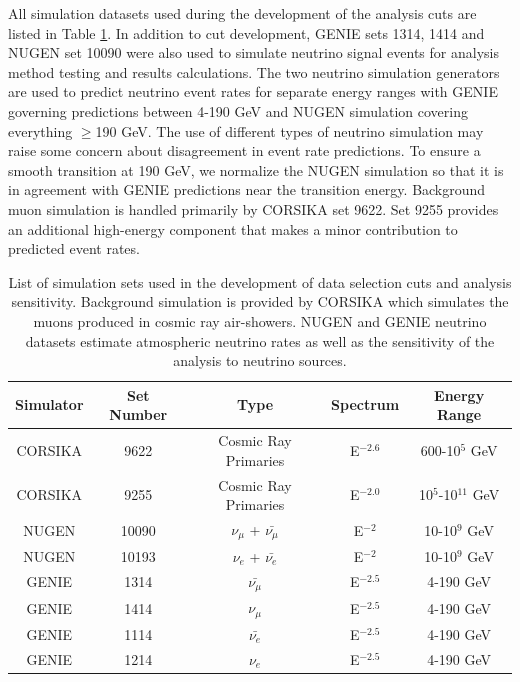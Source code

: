 \documentclass{gatech-thesis}
\begin{document}
All simulation datasets used during the development of the analysis cuts are listed in Table  \ref{tab:event_sel_sim}. In addition to cut development, GENIE sets 1314, 1414 and NUGEN set 10090 were also used to simulate neutrino signal events for analysis method testing and results calculations. The two neutrino simulation generators are used to predict neutrino event rates for separate energy ranges with GENIE governing predictions between 4-190 GeV and NUGEN simulation covering everything $\geq$190 GeV. The use of different types of neutrino simulation may raise some concern about disagreement in event rate predictions. To ensure a smooth transition at 190 GeV, we normalize the NUGEN simulation so that it is in agreement with GENIE predictions near the transition energy. Background muon simulation is handled primarily by CORSIKA set 9622. Set 9255 provides an additional high-energy component that makes a minor contribution to predicted event rates.
\begin{table}[h]
\caption[Ice Properties Systematic Datasets]{List of simulation sets used in the development of data selection cuts and analysis sensitivity. Background simulation is provided by CORSIKA which simulates the muons produced in cosmic ray air-showers. NUGEN and GENIE neutrino datasets estimate atmospheric neutrino rates as well as the sensitivity of the analysis to neutrino sources. \label{tab:event_sel_sim}}
\begin{center}
\begin{tabular}{ccccc}
\toprule
\textbf{Simulator} & \textbf{Set Number} &\textbf{Type} & \textbf{Spectrum} & \textbf{Energy Range}\\
\midrule
CORSIKA & 9622 & Cosmic Ray Primaries & E$^{-2.6}$ & 600-10$^{5}$ GeV \\
CORSIKA & 9255 & Cosmic Ray Primaries & E$^{-2.0}$ & 10$^{5}$-10$^{11}$ GeV \\
NUGEN & 10090 & $\nu_{\mu}$ + $\bar{\nu_{\mu}}$ & E$^{-2}$ & 10-10$^9$ GeV \\
NUGEN & 10193 & $\nu_{e}$ + $\bar{\nu_{e}}$ & E$^{-2}$ & 10-10$^9$ GeV \\
GENIE & 1314 & $\bar{\nu_{\mu}}$ & E$^{-2.5}$ & 4-190 GeV \\
GENIE & 1414 & $\nu_{\mu}$ & E$^{-2.5}$ & 4-190 GeV \\
GENIE & 1114 & $\bar{\nu_{e}}$ & E$^{-2.5}$ & 4-190 GeV \\
GENIE & 1214 & $\nu_{e}$ & E$^{-2.5}$ & 4-190 GeV \\
\hline
\end{tabular}
\end{center}
\end{table}
\end{document}
